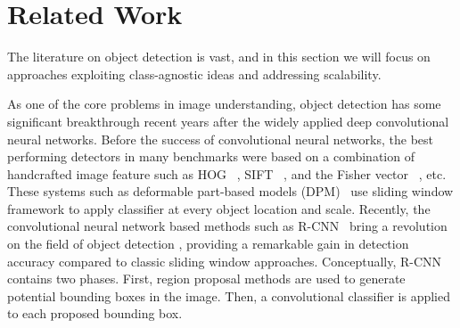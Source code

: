 

\section{Related Work}


The literature on object detection is vast, and in this section we will focus on approaches exploiting class-agnostic ideas and addressing scalability.

As one of the core problems in image understanding, object detection has some significant breakthrough recent years after the widely applied deep convolutional neural networks. Before the success of convolutional neural networks, the best performing detectors in many benchmarks were based on a combination of handcrafted image feature such as HOG~\cite{dalal2005histograms} , SIFT~\cite{lowe2004distinctive} , and the Fisher vector~\cite{cinbis2013segmentation} , etc. These systems such as deformable part-based models (DPM)~\cite{felzenszwalb2010object} use sliding window framework to apply classifier at every object location and scale. Recently, the convolutional neural network based methods such as R-CNN~\cite{girshick2014rich,girshick2015fast} bring a revolution on the field of object detection , providing a remarkable gain in detection accuracy compared to classic sliding window approaches. Conceptually, R-CNN contains two phases. First, region proposal methods are used to generate potential bounding boxes in the image. Then, a convolutional classifier is applied to each proposed bounding box. 


